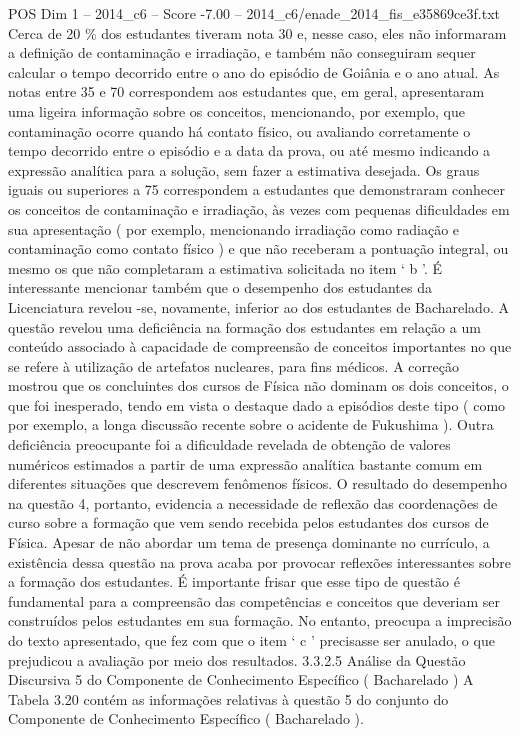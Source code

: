 \begin{textsample}{POS Dim 1 – 2014\_c6 – Score -7.00 – 2014\_c6/enade\_2014\_fis\_e35869ce3f.txt}
Cerca de 20 \% dos estudantes tiveram nota 30 e, nesse caso, eles não informaram a definição de contaminação e irradiação, e também não conseguiram sequer calcular o tempo decorrido entre o ano do episódio de Goiânia e o ano atual.
As notas entre 35 e 70 correspondem aos estudantes que, em geral, apresentaram uma ligeira informação sobre os conceitos, mencionando, por exemplo, que contaminação ocorre quando há contato físico, ou avaliando corretamente o tempo decorrido entre o episódio e a data da prova, ou até mesmo indicando a expressão analítica para a solução, sem fazer a estimativa desejada.
Os graus iguais ou superiores a 75 correspondem a estudantes que demonstraram conhecer os conceitos de contaminação e irradiação, às vezes com pequenas dificuldades em sua apresentação ( por exemplo, mencionando irradiação como radiação e contaminação como contato físico ) e que não receberam a pontuação integral, ou mesmo os que não completaram a estimativa solicitada no item ‘ b ’.
É interessante mencionar também que o desempenho dos estudantes da Licenciatura revelou -se, novamente, inferior ao dos estudantes de Bacharelado.
A questão revelou uma deficiência na formação dos estudantes em relação a um conteúdo associado à capacidade de compreensão de conceitos importantes no que se refere à utilização de artefatos nucleares, para fins médicos.
A correção mostrou que os concluintes dos cursos de Física não dominam os dois conceitos, o que foi inesperado, tendo em vista o destaque dado a episódios deste tipo ( como por exemplo, a longa discussão recente sobre o acidente de Fukushima ).
Outra deficiência preocupante foi a dificuldade revelada de obtenção de valores numéricos estimados a partir de uma expressão analítica bastante comum em diferentes situações que descrevem fenômenos físicos.
O resultado do desempenho na questão 4, portanto, evidencia a necessidade de reflexão das coordenações de curso sobre a formação que vem sendo recebida pelos estudantes dos cursos de Física.
Apesar de não abordar um tema de presença dominante no currículo, a existência dessa questão na prova acaba por provocar reflexões interessantes sobre a formação dos estudantes.
É importante frisar que esse tipo de questão é fundamental para a compreensão das competências e conceitos que deveriam ser construídos pelos estudantes em sua formação.
No entanto, preocupa a imprecisão do texto apresentado, que fez com que o item ‘ c ’ precisasse ser anulado, o que prejudicou a avaliação por meio dos resultados. 3.3.2.5 Análise da Questão Discursiva 5 do Componente de Conhecimento Específico ( Bacharelado ) A Tabela 3.20 contém as informações relativas à questão 5 do conjunto do Componente de Conhecimento Específico ( Bacharelado ).

\end{textsample}

